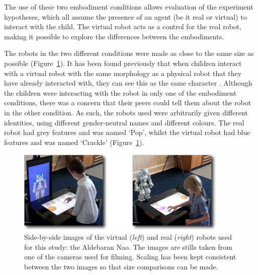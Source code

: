 The use of these two embodiment conditions allows evaluation of the experiment hypotheses, which all assume the presence of an agent (be it real or virtual) to interact with the child. The virtual robot acts as a control for the real robot, making it possible to explore the differences between the embodiments.

The robots in the two different conditions were made as close to the same size as possible (Figure~\ref{fig:ch6-embod}). It has been found previously that when children interact with a virtual robot with the same morphology as a physical robot that they have already interacted with, they can see this as the same character \citep{segura2012revive}. Although the children were interacting with the robot in only one of the embodiment conditions, there was a concern that their peers could tell them about the robot in the other condition. As such, the robots used were arbitrarily given different identities, using different gender-neutral names and different colours. The real robot had grey features and was named `Pop', whilst the virtual robot had blue features and was named `Crackle' (Figure~\ref{fig:ch6-embod}).

\begin{figure}[t!]
    \centering
    \includegraphics[width=0.9\textwidth]{images/ch6_RealVsVirtual_compressed.pdf}
    \caption{Side-by-side images of the  virtual (\textit{left}) and real (\textit{right}) robots used for this study: the Aldebaran Nao. The images are stills taken from one of the cameras used for filming. Scaling has been kept consistent between the two images so that size comparisons can be made.}
    \label{fig:ch6-embod}
\end{figure}

